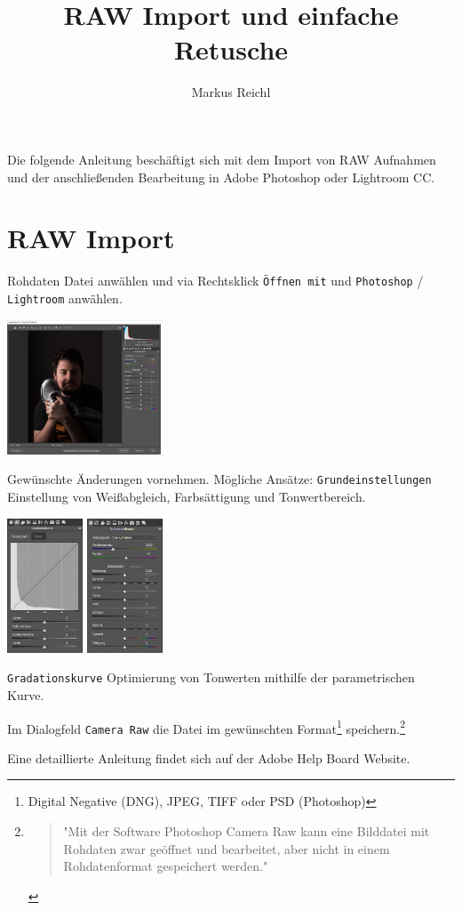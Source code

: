 \documentclass{school}
\title{RAW Import und einfache Retusche}
\author{Markus Reichl}
\begin{document}
\maketitle
\thispagestyle{fancy}

Die folgende Anleitung beschäftigt sich mit dem Import von RAW\cite{wiki-raw} Aufnahmen und der anschließenden Bearbeitung in Adobe Photoshop oder Lightroom CC.

\section{RAW Import}
\begin{outline}[enumerate]
\1 Rohdaten Datei anwählen und via Rechtsklick \texttt{Öffnen mit} und \texttt{Photoshop} / \texttt{Lightroom} anwählen.

\includegraphics[height=4cm]{raw-01.png}

\1 Gewünschte Änderungen vornehmen. Mögliche Ansätze:
	\2 \texttt{Grundeinstellungen} Einstellung von Weißabgleich, Farbsättigung und Tonwertbereich.

\includegraphics[height=4cm]{raw-03-grad.png}
\includegraphics[height=4cm]{raw-02-grund.png}

	\2 \texttt{Gradationskurve} Optimierung von Tonwerten mithilfe der parametrischen Kurve.

\1 Im Dialogfeld \texttt{Camera Raw} die Datei im gewünschten Format\footnote{Digital Negative (DNG), JPEG, TIFF oder PSD (Photoshop)} speichern.\footnote{\begin{quote}"Mit der Software Photoshop Camera Raw kann eine Bilddatei mit Rohdaten zwar geöffnet und bearbeitet, aber nicht in einem Rohdatenformat gespeichert werden."\end{quote}\cite{adobe-raw}}

Eine detaillierte Anleitung findet sich auf der Adobe Help Board Website\cite{adobe-raw}.
\end{outline}
\end{document}
